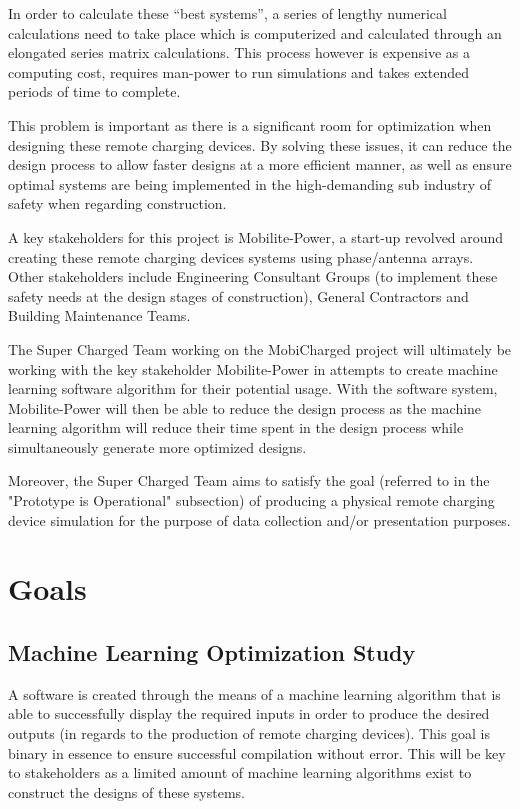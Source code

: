 \documentclass[12pt,a4]{report}
\begin{document}
In order to calculate these “best systems”, a series of lengthy numerical calculations need to take place which is computerized and calculated through an elongated series matrix calculations. This process however is expensive as a computing cost, requires man-power to run simulations and takes extended periods of time to complete.  

This problem is important as there is a significant room for optimization when designing these remote charging devices. By solving these issues, it can reduce the design process to allow faster designs at a more efficient manner, as well as ensure optimal systems are being implemented in the high-demanding sub industry of safety when regarding construction. 

A key stakeholders for this project is Mobilite-Power, a start-up revolved around creating these remote charging devices systems using phase/antenna arrays. Other stakeholders include Engineering Consultant Groups (to implement these safety needs at the design stages of construction), General Contractors and Building Maintenance Teams.

The Super Charged Team working on the MobiCharged project will ultimately be working with the key stakeholder Mobilite-Power in attempts to create machine learning software algorithm for their potential usage. With the software system, Mobilite-Power will then be able to reduce the design process as the machine learning algorithm will reduce their time spent in the design process while simultaneously generate more optimized designs. 

Moreover, the Super Charged Team aims to satisfy the goal (referred to in the "Prototype is Operational" subsection) of producing a physical remote charging device simulation for the purpose of data collection and/or presentation purposes.

\section*{Goals}
\subsection*{Machine Learning Optimization Study}
A software is created through the means of a machine learning algorithm that is able to successfully display the required inputs in order to produce the desired outputs (in regards to the production of remote charging devices). This goal is binary in essence to ensure successful compilation without error. This will be key to stakeholders as a limited amount of machine learning algorithms exist to construct the designs of these systems. 
\end{document}
